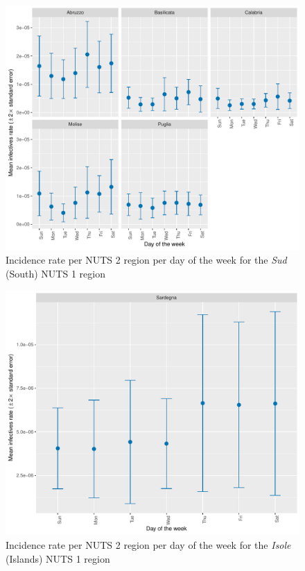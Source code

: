 \documentclass[12pt]{article}
\begin{document}
\begin{appendices}
    	\begin{figure}[H]
    	    \centering
    	    \includegraphics[width=\textwidth]{output/infective_rates_weekday_Sud.pdf}
    	    \caption{Incidence rate per NUTS 2 region per day of the week for the \textit{Sud} (South) NUTS 1 region}
    	    \label{fig:incidence_sud_weekday}
    	\end{figure}
		
		\begin{figure}[H]
    	    \centering
    	    \includegraphics[width=\textwidth]{output/infective_rates_weekday_Isole.pdf}
    	    \caption{Incidence rate per NUTS 2 region per day of the week for the \textit{Isole} (Islands) NUTS 1 region}
    	    \label{fig:incidence_sud_weekday}
    	\end{figure}
		

\end{appendices}
\end{document}
